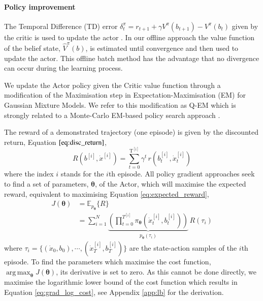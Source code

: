 \documentclass[final,3p,times,twocolumn]{elsarticle}
\newcommand{\B}{b}
\newcommand{\U}{\dot{x}}
\newcommand{\Bi}{b^{[i]}}
\newcommand{\Param}{\boldsymbol{\theta}}
\DeclareMathOperator*{\argmax}{arg\,max}
\begin{document}
\paragraph{Policy improvement}

The Temporal Difference (TD) error $\delta^{\pi}_t = r_{t+1} + \gamma V^{\pi}(b_{t+1}) - V^{\pi}(b_t)$ 
given by the critic is used to update the actor  \cite[Chap. 6]{sutton1998reinforcement}. 
In our offline approach the value function of the belief state, $\hat{V}^{\pi}(\B)$, is estimated 
until convergence and then used to update the actor. This offline batch 
method has the advantage that no divergence can occur during the learning process.

We update the Actor policy given the Critic value function through a modification of the Maximisation step in  Expectation-Maximisation (EM) 
for Gaussian Mixture Models. We refer to this modification as Q-EM which is strongly related to a Monte-Carlo EM-based policy 
search approach \cite[p.50]{p_search_surv_2011}. 

The reward of a demonstrated trajectory (one episode) is given by the discounted return, Equation $\ref{eq:disc_return}$,
\begin{equation}\label{eq:disc_return}
 R(\B^{[i]},\U^{[i]}) = \sum_{t=0}^{\mathrm{T^{[i]}}} \gamma^t \, r(\B^{[i]}_t,\U^{[i]}_t)
\end{equation}
where the index $i$ stands for the $i$th episode.
All policy gradient approaches seek to find a set of parameters, $\Param$, of the Actor,
which will maximise the expected reward, equivalent to maximising Equation \ref{eq:expected_reward},
\begin{align}\label{eq:expected_reward}
 J(\Param) &= \mathbb{E}_{p_{\Param}}\{R\} \nonumber \\
	  &= \sum\limits_{i=1}^{N}   \underbrace{\left( \prod_{t=0}^{T^{[i]}} \pi_{\Param}(\U^{[i]}_t,\B^{[i]}_t) \right)}_{p_{\Param}(\tau_i)} \, R(\tau_i) 
\end{align}
where $\tau_i = \{(\U_0,\B_0),\cdots,(\U_T^{[i]},\B_T^{[i]}) \}$ are the state-action samples of the $i$th episode.
To find the parameters which maximise the cost function, $\argmax_{\Param} J(\Param)$, its derivative is set to zero. 
As this cannot be done directly, we maximise the logarithmic lower bound of the cost function which results in 
Equation \ref{eq:grad_log_cost}, see Appendix \ref{app:lb} for the derivation.
\end{document}
